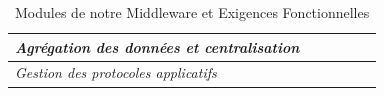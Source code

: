 \begin{table}[h!]
\begin{tabular}{|l|c|c|c|c|c|}
		\textit{Agrégation des données et centralisation}    &                                                                                  &                                                                               & \checkmark                                                                 &                                                                               &                                                                        \\ \hline
		\textit{Gestion des protocoles applicatifs}          &                                                                                  &                                                                               &                                                                            &                                                                               & \checkmark                                                             \\ \hline
	\end{tabular}
	\caption{Modules de notre Middleware et Exigences Fonctionnelles}
\end{table}
